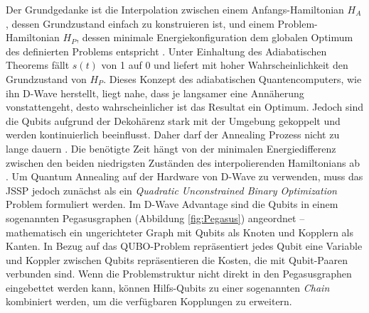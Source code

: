 Der Grundgedanke ist die Interpolation zwischen einem Anfangs-Hamiltonian $H_A$, dessen Grundzustand einfach zu konstruieren ist, und einem Problem-Hamiltonian $H_P$, dessen minimale Energiekonfiguration dem globalen Optimum des definierten Problems entspricht \cite{Farhi2000}. Unter Einhaltung des Adiabatischen Theorems fällt $s(t)$ von 1 auf 0  \cite{Feld2020} und liefert mit hoher Wahrscheinlichkeit den Grundzustand von $H_P$\cite{Albash2018}. Dieses Konzept des adiabatischen Quantencomputers, wie ihn D-Wave herstellt, liegt nahe, dass je langsamer eine Annäherung vonstattengeht, desto wahrscheinlicher ist das Resultat ein Optimum. Jedoch sind die Qubits aufgrund der Dekohärenz \cite{Homeister2018} stark mit der Umgebung gekoppelt und werden kontinuierlich beeinflusst. Daher darf der Annealing Prozess nicht zu lange dauern \cite{Marshall2017}. Die benötigte Zeit hängt von der minimalen Energiedifferenz zwischen den beiden niedrigsten Zuständen des interpolierenden Hamiltonians ab \cite{Farhi2000}.
Um Quantum Annealing auf der Hardware von D-Wave zu verwenden, muss das JSSP jedoch zunächst als ein \textit{Quadratic Unconstrained Binary Optimization} Problem formuliert werden. 
Im D-Wave Advantage sind die Qubits in einem sogenannten Pegasusgraphen (Abbildung \ref{fig:Pegasus}) angeordnet -- mathematisch ein ungerichteter Graph mit Qubits als Knoten und Kopplern als Kanten. In Bezug auf das QUBO-Problem repräsentiert jedes Qubit eine Variable und Koppler zwischen Qubits repräsentieren die Kosten, die mit Qubit-Paaren verbunden sind. Wenn die Problemstruktur nicht direkt in den Pegasusgraphen eingebettet werden kann, können Hilfs-Qubits zu einer sogenannten \textit{Chain} kombiniert werden, um die verfügbaren Kopplungen zu erweitern. \newline

